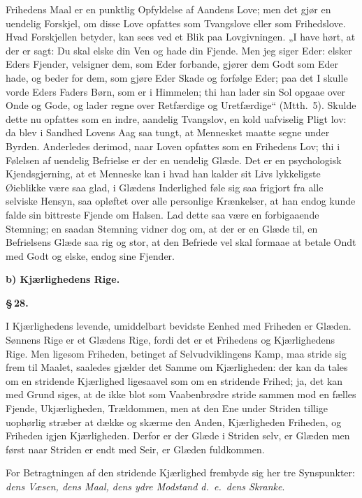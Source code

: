 \documentclass[12pt]{book}
\newcommand{\parmark}[1]{\begin{center}{\bfseries \S\,#1.}\end{center}}
\newcommand{\runhead}[1]{%
  \medskip\begin{center}{\bfseries #1}\end{center}\medskip}
\begin{document}
Frihedens Maal er en punktlig Opfyldelse af Aandens Love; men det
gjør en uendelig Forskjel, om disse Love opfattes som Tvangslove
eller som Frihedslove. Hvad Forskjellen betyder, kan sees ved et
Blik paa Lovgivningen. „I have hørt, at der er sagt: Du skal elske
din Ven og hade din Fjende. Men jeg siger Eder: elsker Eders
Fjender, velsigner dem, som Eder forbande, gjører dem Godt som Eder
hade, og beder for dem, som gjøre Eder Skade og forfølge Eder; paa
det I skulle vorde Eders Faders Børn, som er i Himmelen; thi han
lader sin Sol opgaae over Onde og Gode, og lader regne over
Retfærdige og Uretfærdige“ (Mtth.\ 5). Skulde dette nu opfattes som
en indre, aandelig Tvangslov, en kold uafviselig Pligt\-
lov: da blev i Sandhed Lovens Aag saa tungt, at Mennesket maatte
segne under Byrden. Anderledes derimod, naar Loven opfattes som en
Frihedens Lov; thi i Følelsen af uendelig Befrielse er der en
uendelig Glæde. Det er en psychologisk Kjendsgjerning, at et
Menneske kan i hvad han kalder sit Livs lykkeligste Øieblikke være
saa glad, i Glædens Inderlighed føle sig saa frigjort fra alle
selviske Hensyn, saa opløftet over alle personlige Krænkelser, at
han endog kunde falde sin bittreste Fjende om Halsen. Lad dette saa
være en forbigaaende Stemning; en saadan Stemning vidner dog om, at
der er en Glæde til, en Befrielsens Glæde saa rig og stor, at den
Befriede vel skal formaae at betale Ondt med Godt og elske, endog
sine Fjender.

\runhead{b) Kjærlighedens Rige.}
\parmark{28}

I Kjærlighedens levende, umiddelbart bevidste Eenhed med Friheden er
Glæden. Sønnens Rige er et Glædens Rige, fordi det er et Frihedens
og Kjærlighedens Rige. Men ligesom Friheden, betinget af
Selvudviklingens Kamp, maa stride sig frem til Maalet, saaledes
gjælder det Samme om Kjærligheden: der kan da tales om en stridende
Kjærlighed ligesaavel som om en stridende Frihed; ja, det kan med
Grund siges, at de ikke blot som Vaabenbrødre stride sammen mod en
fælles Fjende, Ukjærligheden, Trældommen, men at den Ene under
Striden tillige uophørlig stræber at dække og skærme den Anden,
Kjærligheden Friheden, og Friheden igjen Kjærligheden. Derfor er der
Glæde i Striden selv, er Glæden men først naar Striden er endt med
Seir, er Glæden fuldkommen.

For Betragtningen af den stridende Kjærlighed frembyde sig her tre
Synspunkter: \emph{dens Væsen, dens Maal, dens ydre Modstand
d.\ e.\ dens Skranke}.
\end{document}
